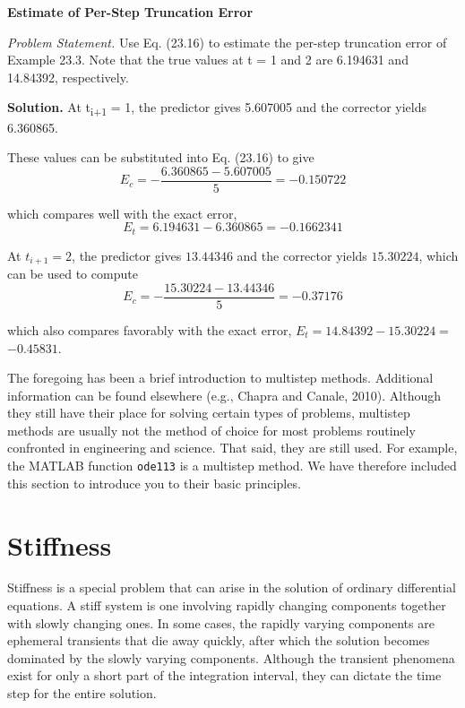 \documentclass[../main.tex]{subfiles}
\begin{document}
\begin{exmp}
    \textbf{Estimate of Per-Step Truncation Error}

    \noindent \textit{Problem Statement.} Use Eq. (23.16) to estimate the per-step truncation error of Example 23.3. Note that the true values at t = 1 and 2 are 6.194631 and 14.84392, respectively.

    \noindent \textbf{Solution.} At t\textsubscript{i+1} = 1, the predictor gives 5.607005 and the corrector yields 6.360865.

    \noindent These values can be substituted into Eq. (23.16) to give
    \begin{equation}
    E_{c}=-\frac{6.360865-5.607005}{5}=-0.150722 \nonumber
    \end{equation}

    \noindent which compares well with the exact error,
    \begin{equation}
    E_{t}=6.194631-6.360865=-0.1662341 \nonumber
    \end{equation}

    \noindent At $t_{i+1}=2$, the predictor gives $13.44346$ and the corrector yields $15.30224$, which can be used to compute
    \begin{equation}
    E_{c}=-\frac{15.30224-13.44346}{5}=-0.37176 \nonumber
    \end{equation}

    \noindent which also compares favorably with the exact error, $E_{t}=14.84392-15.30224=$ $-0.45831$.
\end{exmp}

The foregoing has been a brief introduction to multistep methods. Additional
information can be found elsewhere (e.g., Chapra and Canale, 2010). Although they
still have their place for solving certain types of problems, multistep methods are usually not the method of choice for most problems routinely confronted in engineering and
science. That said, they are still used. For example, the MATLAB function \texttt{ode113} is a
multistep method. We have therefore included this section to introduce you to their basic
principles.

\vspace{2cm}
\section{Stiffness}

\noindent Stiffness is a special problem that can arise in the solution of ordinary differential equations. A stiff system is one involving rapidly changing components together with slowly
changing ones. In some cases, the rapidly varying components are ephemeral transients
that die away quickly, after which the solution becomes dominated by the slowly varying components. Although the transient phenomena exist for only a short part of the integration
interval, they can dictate the time step for the entire solution.
\end{document}
